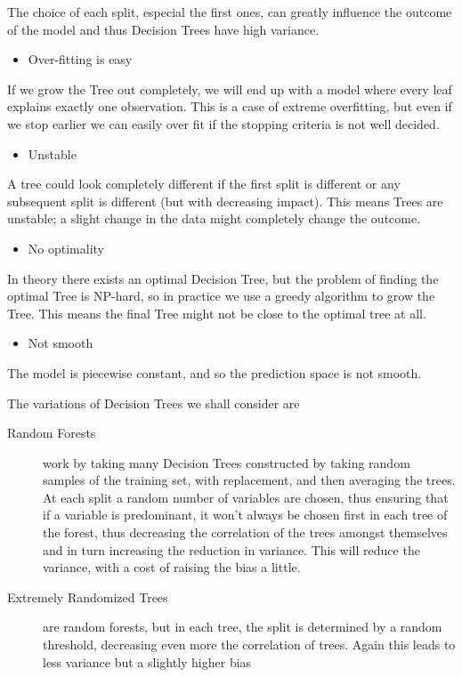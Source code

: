 The choice of each split, especial the first ones, can greatly influence the outcome of the model and thus Decision Trees have high variance.

\begin{itemize}
\item Over-fitting is easy
\end{itemize}
If we grow the Tree out completely, we will end up with a model where every leaf explains exactly one observation. This is a case of extreme overfitting, but even if we stop earlier we can easily over fit if the stopping criteria is not well decided.
\begin{itemize}
\item Unstable
\end{itemize}
A tree could look completely different if the first split is different or any subsequent split is different (but with decreasing impact). This means Trees are unstable; a slight change in the data might completely change the outcome.
\begin{itemize}
\item No optimality
\end{itemize}
In theory there exists an optimal Decision Tree, but the problem of finding the optimal Tree is NP-hard, so in practice we use a greedy algorithm to grow the Tree. This means the final Tree might not be close to the optimal tree at all.
\begin{itemize}
\item Not smooth
\end{itemize}
The model is piecewise constant, and so the prediction space is not smooth.


The variations of Decision Trees we shall consider are

\begin{description}
\item [Random Forests] work by taking many Decision Trees constructed by taking random samples of the training set, with replacement, and then averaging the trees. At each split a random number of variables are chosen, thus ensuring that if a variable is predominant, it won't always be chosen first in each tree of the forest, thus decreasing the correlation of the trees amongst themselves and in turn increasing the reduction in variance.
This will reduce the variance, with a cost of raising the bias a little.

\item [Extremely Randomized Trees] are random forests, but in each tree, the split is determined by a random threshold, decreasing even more the correlation of trees. 
Again this leads to less variance but a slightly higher bias
\end{description}


